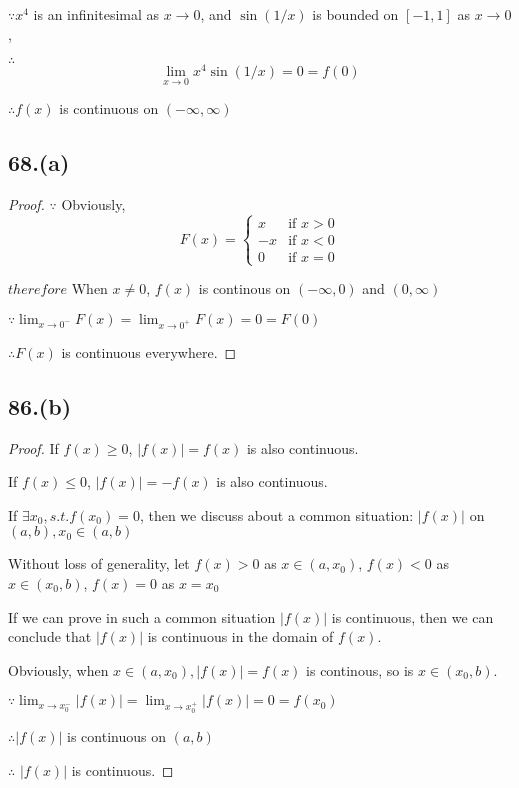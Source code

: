 \documentclass{article}
\begin{document}
    $\because x^4$ is an infinitesimal as $x \to 0$, and $\sin(1/x)$ is bounded on $[-1,1]$ as $x \to 0$,

    $\therefore$ $$\lim_{x \to 0}x^4\sin(1/x) = 0 = f(0)$$

    $\therefore f(x)$ is continuous on $(-\infty, \infty)$

\subsection*{68.(a)}

\begin{proof}
    $\because$ Obviously, $$F(x) = \left \{ \begin{array}{ll}
        x & \textrm{if $x > 0$} \\
        -x & \textrm{if $x < 0$} \\
        0 & \textrm{if $x = 0$}
    \end{array} \right.$$

    $therefore$ When $x \not = 0$, $f(x)$ is continous on $(-\infty, 0)$ and $(0, \infty)$

    $\because \lim_{x \to 0^-}F(x) = \lim_{x \to 0^+}F(x) = 0 = F(0)$

    $\therefore F(x)$ is continuous everywhere.
\end{proof}

\subsection*{86.(b)}

\begin{proof}
    If $f(x) \geq 0$, $|f(x)| = f(x)$ is also continuous.

    If $f(x) \leq 0$, $|f(x)| = -f(x)$ is also continuous.

    If $\exists x_0, s.t. f(x_0) = 0$, then we discuss about a common situation: $|f(x)|$ on $(a,b), x_0 \in (a,b)$

    Without loss of generality, let $f(x) > 0$ as $x \in (a,x_0)$, $f(x) < 0$ as $x \in (x_0, b)$, $f(x) = 0$ as $x = x_0$

    If we can prove in such a common situation $|f(x)|$ is continuous, then we can conclude that $|f(x)|$ is continuous in the domain of $f(x)$.

    Obviously, when $x \in (a, x_0), |f(x)| = f(x)$ is continous, so is $x \in (x_0, b)$.

    $\because \lim_{x \to x_0^-}|f(x)| = \lim_{x \to x_0^+}|f(x)| = 0 = f(x_0)$
    
    $\therefore |f(x)|$ is continuous on $(a,b)$

    $\therefore$ $|f(x)|$ is continuous.
\end{proof}
\end{document}
